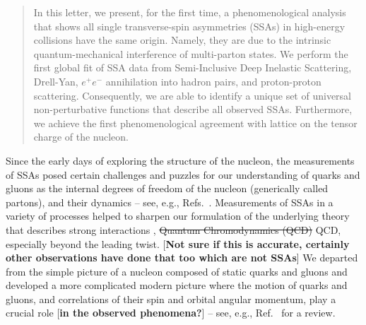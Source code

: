 \documentclass[twocolumn,prl,aps,superscriptaddress
               ,footinbib,amsfonts,amsmath,amssymb,showpacs]{revtex4-1}
\newcommand{\rep}[2]{{\color{blue} \st{#1}} {\color{red} #2}}
\newcommand{\green}[1]{{\color{PineGreen} {#1}}}
\newcommand{\com}[1]{{\color{red} [\textbf{#1}]}}
\begin{document}
\begin{abstract}
\noindent 
In this letter, we present, for the first time, a phenomenological
analysis that shows all single transverse-spin asymmetries (SSAs) in
high-energy collisions have the same origin.  
Namely, they are due to the intrinsic quantum-mechanical interference
of multi-parton states.
We perform the first global fit of SSA data from  Semi-Inclusive Deep
Inelastic Scattering, Drell-Yan, $e^+e^-$ annihilation into hadron
pairs, and proton-proton scattering.
Consequently, we are able to identify a unique set of universal 
non-perturbative functions that describe all observed SSAs.
Furthermore, we achieve the first phenomenological agreement with
lattice on the tensor charge of the nucleon.
\end{abstract}

\pacs{}
\maketitle

Since the early days of exploring the structure of the nucleon, the
measurements of SSAs posed
certain challenges and puzzles for our understanding of quarks and
gluons as the internal degrees of freedom of the nucleon (generically
called partons), and their dynamics -- see, e.g.,
Refs.~\cite{Bunce:1976yb,Kane:1978nd}. 
%
\green{
Measurements of SSAs in a variety of processes helped to sharpen our
formulation of the underlying theory that describes strong
interactions , \rep{Quantum Chromodynamics (QCD)}{QCD, especially beyond the leading twist}. }
\com{Not sure if this is accurate, certainly other observations have 
done that too which are not SSAs}
%
We departed from the simple picture of a nucleon composed of static
quarks and gluons and developed a more complicated modern picture
where the motion of quarks and gluons, and correlations of their spin
and orbital angular momentum, play a crucial role 
\com{in the observed phenomena?}
-- see, e.g.,
Ref.~\cite{Perdekamp:2015vwa} for a review. 
\end{document}
